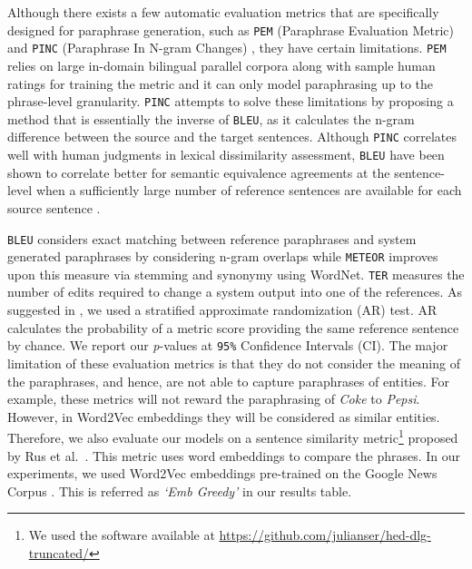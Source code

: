 Although there exists a few automatic evaluation metrics that are specifically designed for paraphrase generation, such as \texttt{PEM} (Paraphrase Evaluation Metric) \cite{LiuDN10} and \texttt{PINC} (Paraphrase In N-gram Changes) \cite{ChenD11}, they have certain limitations. \texttt{PEM} relies on large in-domain bilingual parallel corpora along with sample human ratings for training the metric and it can only model paraphrasing up to the phrase-level granularity. \texttt{PINC} attempts to solve these limitations by proposing a method that is essentially the inverse of \texttt{BLEU}, as it calculates the n-gram difference between the source and the target sentences. Although \texttt{PINC} correlates well with human judgments in lexical dissimilarity assessment, \texttt{BLEU} have been shown to correlate better for semantic equivalence agreements at the sentence-level when a sufficiently large number of reference sentences are available for each source sentence \cite{ChenD11}.
 
\texttt{BLEU} considers exact matching between reference paraphrases and system generated paraphrases by considering n-gram overlaps while \texttt{METEOR} improves upon this measure via stemming and synonymy using WordNet. \texttt{TER} measures the number of edits required to change a system output into one of the references. As suggested in \cite{Clark:2011}, we used a stratified approximate randomization (AR) test. AR calculates the probability of a metric score providing the same reference sentence by chance. We report our {\it p}-values at \texttt{95\%} Confidence Intervals (CI).
The major limitation of these evaluation metrics is that they do not consider the meaning of the paraphrases, and hence, are not able to capture paraphrases of entities. For example, these metrics will not reward the paraphrasing of \emph{Coke} to \emph{Pepsi}. However, in Word2Vec embeddings they will be considered as similar entities. Therefore, we also evaluate our models on a sentence similarity metric\footnote{We used the software available at \url{https://github.com/julianser/hed-dlg-truncated/}} proposed by Rus et al.~\cite{rus2012comparison}. This metric uses word embeddings to compare the phrases. In our experiments, we used Word2Vec embeddings pre-trained on the Google News Corpus \cite{mikolov2014word2vec}. This is referred as \emph{`Emb Greedy'} in our results table.

